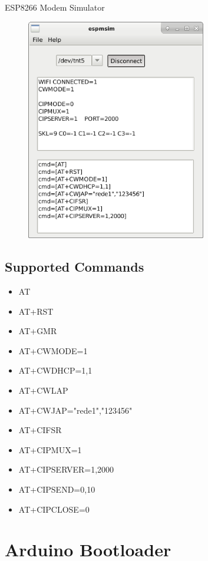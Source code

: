 ESP8266 Modem Simulator

\begin{figure}[H]
\center
\includegraphics[width=0.7\textwidth]{img/espmsim.png} 
\end{figure} 

\subsection{Supported Commands}

\begin{itemize}
\item AT
\item AT+RST
\item AT+GMR
\item AT+CWMODE=1
\item AT+CWDHCP=1,1
\item AT+CWLAP
\item AT+CWJAP="rede1","123456"
\item AT+CIFSR
\item AT+CIPMUX=1
\item AT+CIPSERVER=1,2000
\item AT+CIPSEND=0,10
\item AT+CIPCLOSE=0
\end{itemize}


\section{Arduino Bootloader}\hypertarget{def:aboot}{}

